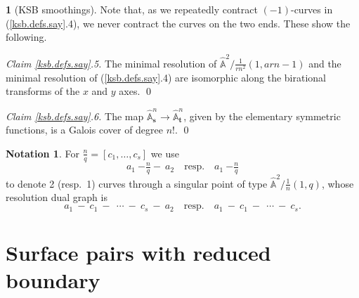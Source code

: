 \documentclass{amsart}
\theoremstyle{definition}
\newtheorem{say}[thm]{}
\newtheorem{notation}[thm]{Notation}
\theoremstyle{remark}
\renewcommand{\a}[0]{\hat{\mathbb A}}
\newcommand{\qtq}[1]{\quad\mbox{#1}\quad}
\begin{document}
\begin{say}[KSB smoothings]
   Note that, as we repeatedly contract $(-1)$-curves in  (\ref{ksb.defs.say}.4), we never contract the curves on the two ends. These show the following.
   \medskip

   {\it Claim \ref{ksb.defs.say}.5.}  The minimal resolution of
   $\a^2/\tfrac1{rn^2}(1, arn{-}1)$ and the minimal resolution of (\ref{ksb.defs.say}.4) are isomorphic along the birational transforms of the $x$ and $y$ axes. \qed
   \medskip




   {\it Claim \ref{ksb.defs.say}.6.}
 The map  $\a^n_{\mathbf s}\to \a^n_{\mathbf t}$, given by the elementary symmetric functions, is a Galois cover of degree $n!$. \qed
  \end{say}



  \begin{notation} \label{boxed.nota} For $\frac{n}{q}=[c_1,\dots, c_s]$ we use
    $$
    a_1\ {-\boxed{\tfrac{n}{q}}-}\ a_2   \qtq{resp.}
    a_1\ {-\boxed{\tfrac{n}{q}}}
    $$
    to denote 2 (resp.\ 1) curves through a singular point of type $\a^2/\frac1{n}(1,q)$,  whose resolution dual graph is
    $$
    a_1\ -\ c_1 \ -\  \ \cdots \ - \ c_s \ -\ a_2
    \qtq{resp.}
     a_1\ -\ c_1 \ -\  \ \cdots \ - \ c_s.
    $$
    \end{notation}
    

    
\section{Surface pairs with reduced boundary}
\end{document}
